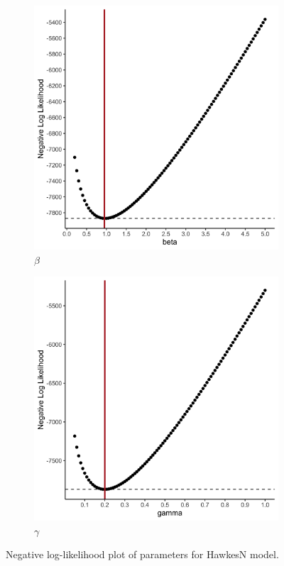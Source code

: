 \documentclass[12pt]{article}
\begin{document}
\begin{figure}
\centering
\begin{subfigure}{.5\textwidth}
  \centering
  \includegraphics[width=0.9\linewidth]{../figures/SIR_neg-log-likelihood-plot_beta.png}
  \caption{$\beta$}
\end{subfigure}%
\begin{subfigure}{.5\textwidth}
  \centering
  \includegraphics[width=0.9\linewidth]{../figures/SIR_neg-log-likelihood-plot_gamma.png}
  \caption{$\gamma$}
\end{subfigure}
\caption{Negative log-likelihood plot of parameters for HawkesN model. }
\label{fig:HawkesN-ll}
\end{figure}
\end{document}

